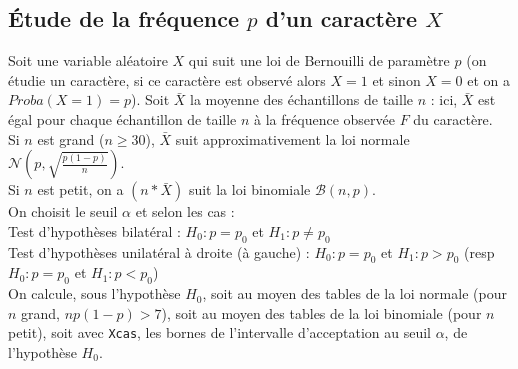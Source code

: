 \documentclass[a4paper,11pt]{book}
\begin{document}
\subsection{\'Etude de la fr\'equence  $p$ d'un caract\`ere $X$}
Soit une variable al\'eatoire $X$ qui suit une loi de Bernouilli de 
param\`etre $p$ (on \'etudie un caract\`ere, si ce caract\`ere est observ\'e 
alors $X=1$ et sinon $X=0$ et on a $Proba(X=1)=p$). Soit $\bar X$ la moyenne 
des \'echantillons de taille $n$ : ici, $\bar X$ est \'egal pour chaque 
\'echantillon de taille $n$ \`a la fr\'equence observ\'ee $F$ du caract\`ere.\\
Si $n$ est grand ($n \geq 30$), $\bar X$ suit approximativement la 
loi normale $\mathcal N(p,\sqrt{\frac{p(1-p)}{n}})$.\\
 Si $n$ est petit, on a  $(n*\bar X)$ suit la loi binomiale 
$\mathcal B(n,p)$.\\
On choisit le seuil $\alpha$ et selon les cas :\\
Test d'hypoth\`eses bilat\'eral : $H_0 : p =p_0$ et  $H_1 : p \neq p_0$\\
Test d'hypoth\`eses unilat\'eral \`a droite (\`a gauche) : $H_0 :p =p_0$ et 
 $H_1:p > p_0$ (resp $H_0 : p =p_0$ et  $H_1:p< p_0$)\\
On calcule, sous l'hypoth\`ese $H_0$, soit au moyen des tables de la loi 
normale (pour $n$ grand, $np(1-p)>7$), soit au moyen des tables de la loi 
binomiale (pour $n$ petit), soit avec {\tt Xcas}, les bornes de l'intervalle 
d'acceptation au seuil $\alpha$, de l'hypoth\`ese $H_0$. 
\end{document}
